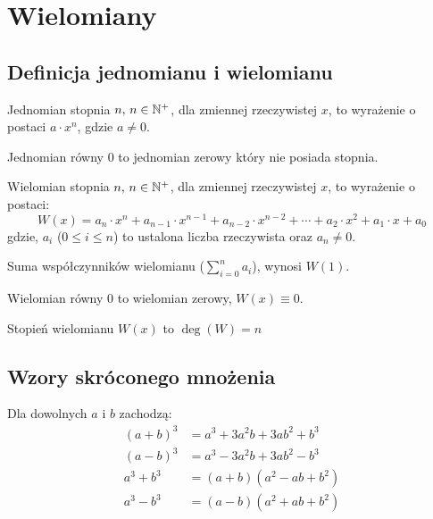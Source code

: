 
\chapter{Wielomiany}
\setcounter{section}{-1}
\section{Definicja jednomianu i wielomianu}

\begin{definition}
  Jednomian stopnia $n, \, n \in \mathbb{N}^+$, dla zmiennej rzeczywistej $x$, to wyrażenie o postaci
  $a \cdot x^n$, gdzie $a \neq 0$.
\end{definition}

\begin{example}
  Jednomian równy 0 to jednomian zerowy który nie posiada stopnia.
\end{example}

\begin{definition}
  Wielomian stopnia $n, \, n \in \mathbb{N}^+$, dla zmiennej rzeczywistej $x$, to wyrażenie o postaci:
  $$W(x)  = a_{n} \cdot x^{n} + a_{n - 1} \cdot x^{n - 1} + a_{n - 2} \cdot x^{n - 2} + \cdots + a_{2} \cdot x^{2} + a_{1} \cdot x + a_{0}$$
  gdzie, $a_i$ ($0 \leq i \leq n$) to ustalona liczba rzeczywista oraz $a_n \neq 0$.
\end{definition}

\begin{example}
  Suma współczynników wielomianu ($\sum_{i = 0}^{n}{a_i}$), wynosi $W(1)$.
\end{example}

\begin{example}
  Wielomian równy 0 to wielomian zerowy, $W(x) \equiv 0$.
\end{example}

\begin{example}
  Stopień wielomianu $W(x)$ to $\deg(W) = n$
\end{example}

\section{Wzory skróconego mnożenia}

\begin{theorem}
  Dla dowolnych $a$ i $b$ zachodzą:
  \begin{align*}
    \left( a + b \right)^3 &= a^3 + 3a^2b + 3ab^2 + b^3 \\
    \left( a - b \right)^3 &= a^3 - 3a^2b + 3ab^2 - b^3 \\
    a^3 + b^3 &= \left( a + b \right)\left( a^2 - ab + b^2 \right) \\
    a^3 - b^3 &= \left( a - b \right)\left( a^2 + ab + b^2 \right)
  \end{align*}
\end{theorem}

